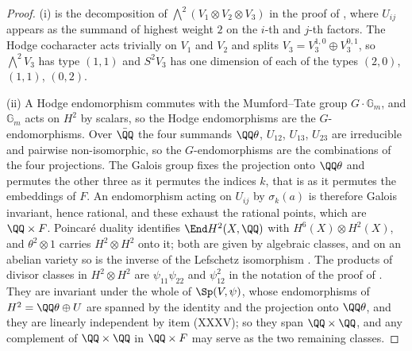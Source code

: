 \begin{proof}
(i) is the decomposition of $\bigwedge^{2}(V_{1}\otimes V_{2}\otimes V_{3})$
in the proof of , where $U_{ij}$ appears as the
summand of highest weight $2$ on the $i$-th and $j$-th factors. The Hodge
cocharacter acts trivially on $V_{1}$ and $V_{2}$ and splits
$V_{3}=V_{3}^{1,0}\oplus V_{3}^{0,1}$, so $\bigwedge^{2}V_{3}$ has type
$(1,1)$ and $S^{2}V_{3}$ has one dimension of each of the types $(2,0)$,
$(1,1)$, $(0,2)$.

(ii) A Hodge endomorphism commutes with the Mumford--Tate group $G\cdot\mathbb{G}_{m}$, and
$\mathbb{G}_{m}$ acts on $H^{2}$ by scalars, so the Hodge endomorphisms are
the $G$-endomorphisms. Over $\bar{\QQ}$ the four summands $\QQ\theta$,
$U_{12}$, $U_{13}$, $U_{23}$ are irreducible and pairwise non-isomorphic, so
the $G$-endomorphisms are the combinations of the four projections. The
Galois group fixes the projection onto $\QQ\theta$ and permutes the other
three as it permutes the indices $k$, that is as it permutes the embeddings of
$F$. An endomorphism acting on $U_{ij}$ by $\sigma_{k}(a)$ is therefore
Galois invariant, hence rational, and these exhaust the rational points,
which are $\QQ\times F$. Poincar\'e duality identifies $\End H^{2}(X,\QQ)$
with $H^{6}(X)\otimes H^{2}(X)$, and $\theta^{2}\otimes1$ carries
$H^{2}\otimes H^{2}$ onto it; both are given by algebraic classes, and on an
abelian variety so is the inverse of the Lefschetz isomorphism
\cite[\S2]{Kle68}. The products of divisor classes in $H^{2}\otimes H^{2}$
are $\psi_{11}\psi_{22}$ and $\psi_{12}^{2}$ in the notation of the proof of
. They are invariant under the whole of
$\Sp(V,\psi)$, whose endomorphisms of $H^{2}=\QQ\theta\oplus U$ are spanned
by the identity and the projection onto $\QQ\theta$, and they are linearly
independent by item (XXXV); so they span $\QQ\times\QQ$, and any complement of
$\QQ\times\QQ$ in $\QQ\times F$ may serve as the two remaining classes.


\end{proof}
